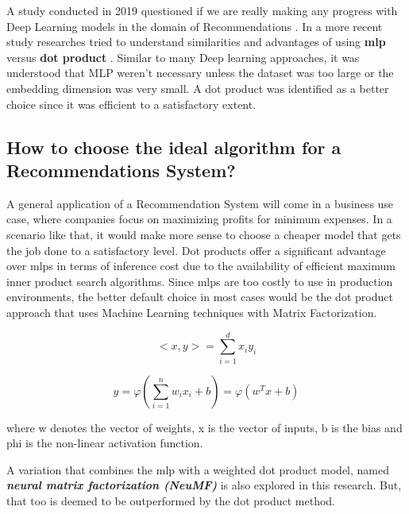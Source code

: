 A study conducted in 2019 questioned if we are really making any progress with Deep Learning models in the domain of Recommendations \autocite{dacrema_are_2019}. In a more recent study researches tried to understand similarities and advantages of using \textbf{\gls{mlp}} versus \textbf{dot product} \autocite{rendle_neural_2020}. Similar to many Deep learning approaches, it was understood that MLP weren't necessary unless the dataset was too large or the embedding dimension was very small. A dot product was identified as a better choice since it was efficient to a satisfactory extent.

\subsection{How to choose the ideal algorithm for a Recommendations System?}

A general application of a Recommendation System will come in a business use case, where companies focus on maximizing profits for minimum expenses. In a scenario like that, it would make more sense to choose a cheaper model that gets the job done to a satisfactory level. Dot products offer a significant advantage over \gls{mlp}s in terms of inference cost due to the availability of efficient maximum inner product search algorithms. Since \gls{mlp}s are too costly to use in production environments, the better default choice in most cases would be the dot product approach that uses Machine Learning techniques with Matrix Factorization.

\begin{equation}
<x,y>  = \sum_{i=1}^{d}x_{i}y_{i}
\end{equation}

\begin{equation}
y = \varphi(\sum_{i=1}^{n}w_{i}x_{i}+b) = \varphi(w^{T}x+b)
\end{equation}

where w denotes the vector of weights, x is the vector of inputs, b is the bias and phi is the non-linear activation function.

A variation that combines the \gls{mlp} with a weighted dot product model, named \textbf{\emph{neural matrix factorization (NeuMF)}} is also explored in this research. But, that too is deemed to be outperformed by the dot product method.

